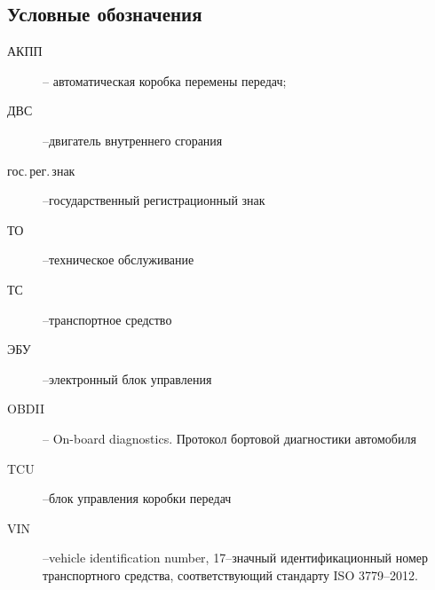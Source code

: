 \subsection{Условные обозначения}
%
\begin{description}
%	 
\item
[АКПП] -- автоматическая коробка перемены передач;
\item
[ДВС] --двигатель внутреннего сгорания
\item
[гос.\,рег.\,знак] --государственный регистрационный знак
\item
[ТО] --техническое обслуживание
\item
[ТС] --транспортное средство
\item
[ЭБУ] --электронный блок управления
\item
[OBDII] -- On-board diagnostics. Протокол бортовой диагностики автомобиля
\item[TCU] --блок управления коробки передач
\item
[VIN] --vehicle identification number, 17--значный идентификационный номер транспортного средства, соответствующий стандарту ISO 3779--2012.
%
\end{description}

